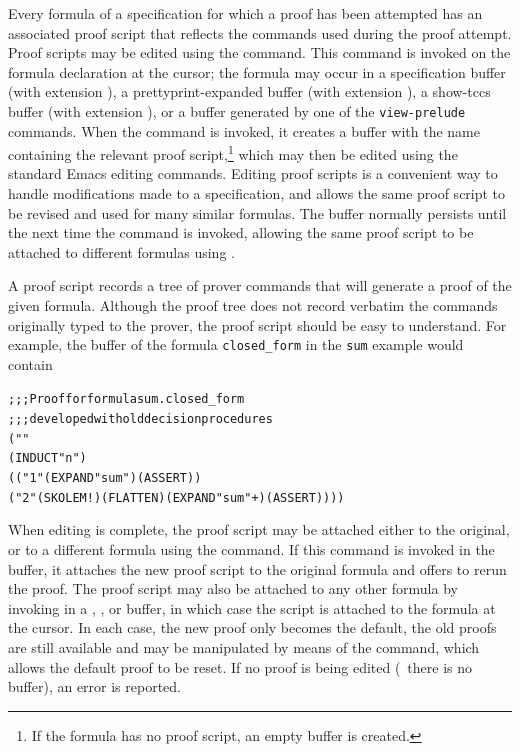 Every formula of a specification for which a proof has been attempted has
an associated proof script that reflects the commands used during the
proof attempt.  Proof scripts may be edited using the 
command.  This command is invoked on the formula declaration at the
cursor; the formula may occur in a specification buffer (with extension
), a prettyprint-expanded buffer (with extension ),
a show-tccs buffer (with extension ), or a buffer generated by
one of the \texttt{view-prelude} commands.  When the 
command is invoked, it creates a buffer with the name 
containing the relevant proof script,\footnote{If the formula has no proof
script, an empty  buffer is created.}  which may then be
edited using the standard Emacs editing commands.  Editing proof scripts
is a convenient way to handle modifications made to a specification, and
allows the same proof script to be revised and used for many similar
formulas.  The  buffer normally persists until the next time
the  command is invoked, allowing the same proof script to
be attached to different formulas using .

A proof script records a tree of prover commands that will generate a
proof of the given formula.  Although the proof tree does not record
verbatim the commands originally typed to the prover, the proof script
should be easy to understand.  For example, the  buffer of
the formula \texttt{closed\_form} in the \texttt{sum} example would
contain

{\small\small
\begin{alltt}
  ;;; Proof for formula sum.closed_form
  ;;; developed with old decision procedures
  (""
   (INDUCT "n")
   (("1" (EXPAND "sum") (ASSERT))
    ("2" (SKOLEM!) (FLATTEN) (EXPAND "sum" +) (ASSERT))))
\end{alltt}}

When editing is complete, the proof script may be attached either to the
original, or to a different formula using the  command.
If this command is invoked in the  buffer, it attaches the new
proof script to the original formula and offers to rerun the proof.  The
proof script may also be attached to any other formula by invoking
 in a , , or  buffer,
in which case the script is attached to the formula at the cursor.  In
each case, the new proof only becomes the default, the old proofs are
still available and may be manipulated by means of the
 command, which allows the default proof to be
reset.  If no proof is being edited (\ie\ there is no 
buffer), an error is reported.


